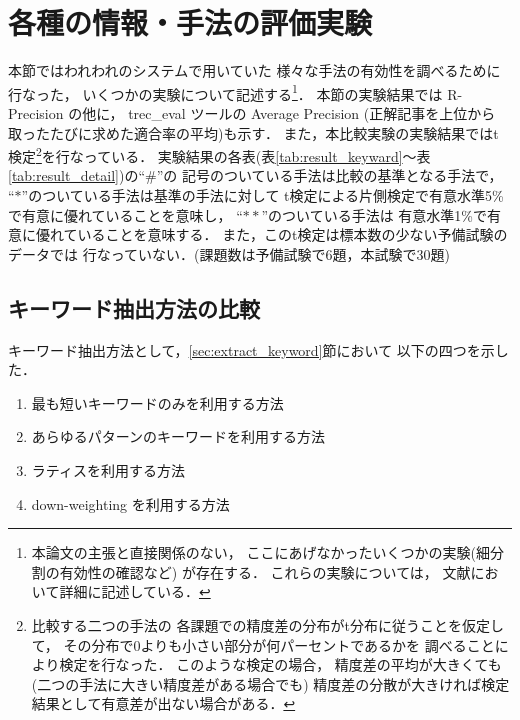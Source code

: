 \section{各種の情報・手法の評価実験}
本節ではわれわれのシステムで用いていた
様々な手法の有効性を調べるために行なった，
いくつかの実験について記述する\footnote{本論文の主張と直接関係のない，
ここにあげなかったいくつかの実験(細分割の有効性の確認など)
が存在する．
これらの実験については，
文献\cite{irex1_IR}において詳細に記述している．}．
本節の実験結果では R-Precision の他に，
trec\_eval ツールの Average Precision (正解記事を上位から
取ったたびに求めた適合率の平均)も示す．
また，本比較実験の実験結果ではt検定\footnote{比較する二つの手法の
各課題での精度差の分布がt分布に従うことを仮定して，
その分布で0よりも小さい部分が何パーセントであるかを
調べることにより検定を行なった．
このような検定の場合，
精度差の平均が大きくても(二つの手法に大きい精度差がある場合でも)
精度差の分散が大きければ検定結果として有意差が出ない場合がある．}を行なっている．
実験結果の各表(表\ref{tab:result_keyward}〜表\ref{tab:result_detail})の``$\#$''の
記号のついている手法は比較の基準となる手法で，
``$*$''のついている手法は基準の手法に対して
t検定による片側検定で有意水準5\%で有意に優れていることを意味し，
``$**$''のついている手法は
有意水準1\%で有意に優れていることを意味する．
また，このt検定は標本数の少ない予備試験のデータでは
行なっていない．(課題数は予備試験で6題，本試験で30題)

\subsection{キーワード抽出方法の比較}

キーワード抽出方法として，\ref{sec:extract_keyword}節において
以下の四つを示した．

\begin{enumerate}
\item 
{最も短いキーワードのみを利用する方法}
\item 
{あらゆるパターンのキーワードを利用する方法}
\item 
{ラティスを利用する方法}
\item 
{down-weighting を利用する方法}
\end{enumerate}


